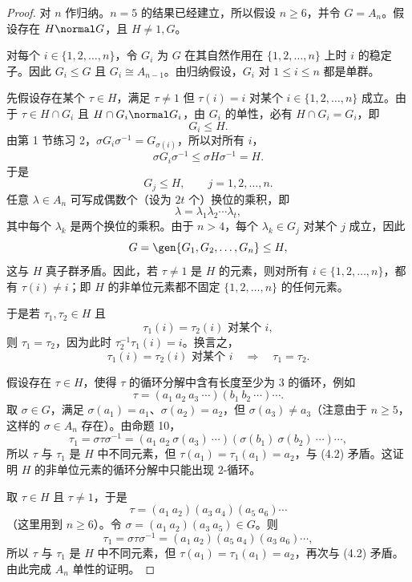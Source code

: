 \begin{proof}
对 $n$ 作归纳。$n=5$ 的结果已经建立，所以假设 $n\geq6$，并令 $G=A_n$。假设存在 $H\normal G$，且 $H\neq1,G$。

对每个 $i\in\{1,2,\ldots,n\}$，令 $G_i$ 为 $G$ 在其自然作用在 $\{1,2,\ldots,n\}$ 上时 $i$ 的稳定子。因此 $G_i\leq G$ 且 $G_i\cong A_{n-1}$。由归纳假设，$G_i$ 对 $1\leq i\leq n$ 都是单群。

先假设存在某个 $\tau\in H$，满足 $\tau\neq1$ 但 $\tau(i)=i$ 对某个 $i\in\{1,2,\ldots,n\}$ 成立。由于 $\tau\in H\cap G_i$ 且 $H\cap G_i\normal G_i$，由 $G_i$ 的单性，必有 $H\cap G_i=G_i$，即
\[
  G_i\leq H.
\]
由第 1 节练习 2，$\sigma G_i\sigma^{-1}=G_{\sigma(i)}$，所以对所有 $i$，
\[
  \sigma G_i\sigma^{-1}\leq \sigma H\sigma^{-1}=H.
\]
于是
\[
  G_j\leq H,
  \qquad j=1,2,\ldots,n.
\]
任意 $\lambda\in A_n$ 可写成偶数个（设为 $2t$ 个）换位的乘积，即
\[
  \lambda=\lambda_1\lambda_2\cdots\lambda_t,
\]
其中每个 $\lambda_k$ 是两个换位的乘积。由于 $n>4$，每个 $\lambda_k\in G_j$ 对某个 $j$ 成立，因此
\[
  G=\gen{G_1,G_2,\ldots,G_n}\leq H,
\]
这与 $H$ 真子群矛盾。因此，若 $\tau\neq1$ 是 $H$ 的元素，则对所有 $i\in\{1,2,\ldots,n\}$，都有 $\tau(i)\neq i$；即 $H$ 的非单位元素都不固定 $\{1,2,\ldots,n\}$ 的任何元素。

于是若 $\tau_1,
\tau_2\in H$ 且
\[
  \tau_1(i)=\tau_2(i)\text{ 对某个 }i,
\]
则 $\tau_1=\tau_2$，因为此时 $\tau_2^{-1}\tau_1(i)=i$。换言之，
\[
  \tau_1(i)=\tau_2(i)\text{ 对某个 }i\quad\Longrightarrow\quad \tau_1=\tau_2. \tag{4.2}
\]

假设存在 $\tau\in H$，使得 $\tau$ 的循环分解中含有长度至少为 $3$ 的循环，例如
\[
  \tau=(a_1\ a_2\ a_3\ \cdots)(b_1\ b_2\ \cdots)\cdots.
\]
取 $\sigma\in G$，满足 $\sigma(a_1)=a_1$、$\sigma(a_2)=a_2$，但 $\sigma(a_3)\neq a_3$（注意由于 $n\geq5$，这样的 $\sigma\in A_n$ 存在）。由命题 10，
\[
  \tau_1=\sigma\tau\sigma^{-1}
  =(a_1\ a_2\ \sigma(a_3)\ \cdots)(\sigma(b_1)\ \sigma(b_2)\ \cdots)\cdots,
\]
所以 $\tau$ 与 $\tau_1$ 是 $H$ 中不同元素，但 $\tau(a_1)=\tau_1(a_1)=a_2$，与 (4.2) 矛盾。这证明 $H$ 的非单位元素的循环分解中只能出现 $2$-循环。

取 $\tau\in H$ 且 $\tau\neq1$，于是
\[
  \tau=(a_1\ a_2)(a_3\ a_4)(a_5\ a_6)\cdots
\]
（这里用到 $n\geq6$）。令 $\sigma=(a_1\ a_2)(a_3\ a_5)\in G$。则
\[
  \tau_1=\sigma\tau\sigma^{-1}
  =(a_1\ a_2)(a_5\ a_4)(a_3\ a_6)\cdots,
\]
所以 $\tau$ 与 $\tau_1$ 是 $H$ 中不同元素，但 $\tau(a_1)=\tau_1(a_1)=a_2$，再次与 (4.2) 矛盾。由此完成 $A_n$ 单性的证明。
\end{proof}

